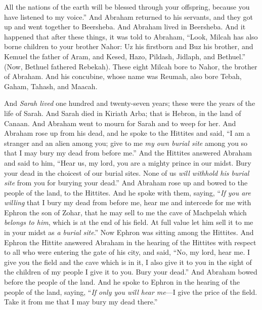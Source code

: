 \begin{biblechapter}
\verse All the nations of the earth will be blessed through your offspring, because you have listened to my voice.”
\verse And Abraham returned to his servants, and they got up and went together to Beersheba. And Abraham lived in Beersheba.
\verse And it happened that after these things, it was told to Abraham, “Look, Milcah has also borne children to your brother Nahor:
\verse Uz his firstborn and Buz his brother, and Kemuel the father of Aram,
\verse and Kesed, Hazo, Pildash, Jidlaph, and Bethuel.”
\verse (Now, Bethuel fathered Rebekah). These eight Milcah bore to Nahor, the brother of Abraham.
\verse And his concubine, whose name was Reumah, also bore Tebah, Gaham, Tahash, and Maacah.
\end{biblechapter}

\begin{biblechapter} %
 And \textit{Sarah lived} one hundred and twenty-seven years; these were the years of the life of Sarah.
\verse And Sarah died in Kiriath Arba; that is Hebron, in the land of Canaan.
\verse And Abraham went to mourn for Sarah and to weep for her. And Abraham rose up from his dead, and he spoke to the Hittites and said,
\verse “I am a stranger and an alien among you; give to me \textit{my own burial site} among you so that I may bury my dead from before me.”
\verse And the Hittites answered Abraham and said to him,
\verse “Hear us, my lord, you are a mighty prince in our midst. Bury your dead in the choicest of our burial sites. None of us \textit{will withhold his burial site} from you for burying your dead.”
\verse And Abraham rose up and bowed to the people of the land, to the Hittites.
\verse And he spoke with them, saying, “\textit{If you are willing} that I bury my dead from before me, hear me and intercede for me with Ephron the son of Zohar,
\verse that he may sell to me the cave of Machpelah which \textit{belongs to him}, which is at the end of his field. At full value let him sell it to me in your midst as \textit{a burial site}.”
\verse Now Ephron was sitting among the Hittites. And Ephron the Hittite answered Abraham in the hearing of the Hittites with respect to all who were entering the gate of his city, and said,
\verse “No, my lord, hear me. I give you the field and the cave which is in it, I also give it to you in the sight of the children of my people I give it to you. Bury your dead.”
\verse And Abraham bowed before the people of the land.
\verse And he spoke to Ephron in the hearing of the people of the land, saying, “\textit{If only you will hear me}—I give the price of the field. Take it from me that I may bury my dead there.”

\end{biblechapter}
